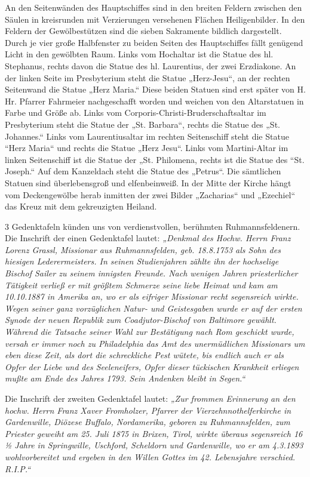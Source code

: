 \documentclass[12pt,a4paper]{book}
\begin{document}
An den Seitenwänden des Hauptschiffes sind in den breiten Feldern zwischen den
Säulen in kreisrunden mit Verzierungen versehenen Flächen Heiligenbilder. In den
Feldern der Gewölbestützen sind die sieben Sakramente bildlich dargestellt.
Durch je vier große Halbfenster zu beiden Seiten des Hauptschiffes fällt
genügend Licht in den gewölbten Raum. Links vom Hochaltar ist die Statue des hl.
Stephanus, rechts davon die Statue des hl. Laurentius, der zwei Erzdiakone. An
der linken Seite im Presbyterium steht die Statue „Herz-Jesu“, an der rechten
Seitenwand die Statue „Herz Maria.“ Diese beiden Statuen sind erst später von H.
Hr. Pfarrer Fahrmeier nachgeschafft worden und weichen von den Altarstatuen in
Farbe und Größe ab. Links vom Corporis-Christi-Bruderschaftsaltar im
Presbyterium steht die Statue der „St. Barbara“, rechts die Statue des „St.
Johannes.“ Links vom Laurentiusaltar im rechten Seitenschiff steht die Statue
“Herz Maria“ und rechts die Statue „Herz Jesu“. Links vom Martini-Altar im
linken Seitenschiff ist die Statue der „St. Philomena, rechts ist die Statue des
“St. Joseph.“ Auf dem Kanzeldach steht die Statue des „Petrus“. Die sämtlichen
Statuen sind überlebensgroß und elfenbeinweiß. In der Mitte der Kirche hängt vom
Deckengewölbe herab inmitten der zwei Bilder „Zacharias“ und „Ezechiel“ das
Kreuz mit dem gekreuzigten Heiland.

3 Gedenktafeln künden uns von verdienstvollen, berühmten Ruhmannsfeldenern. Die
Inschrift der einen Gedenktafel lautet: \emph{„Denkmal des Hochw. Herrn Franz
Lorenz Grassl, Missionar aus Ruhmannsfelden, geb. 18.8.1753 als Sohn des
hiesigen Lederermeisters. In seinen Studienjahren zählte ihn der hochselige
Bischof Sailer zu seinem innigsten Freunde. Nach wenigen Jahren priesterlicher
Tätigkeit verließ er mit größtem Schmerze seine liebe Heimat und kam am
10.10.1887 in Amerika an, wo er als eifriger Missionar recht segensreich wirkte.
Wegen seiner ganz vorzüglichen Natur- und Geistesgaben wurde er auf der ersten
Synode der neuen Republik zum Coadjutor-Bischof von Baltimore gewählt. Während
die Tatsache seiner Wahl zur Bestätigung nach Rom geschickt wurde, versah er
immer noch zu Philadelphia das Amt des unermüdlichen Missionars um eben diese
Zeit, als dort die schreckliche Pest wütete, bis endlich auch er als Opfer der
Liebe und des Seeleneifers, Opfer dieser tückischen Krankheit erliegen mußte am
Ende des Jahres 1793. Sein Andenken bleibt in Segen.“}

Die Inschrift der zweiten Gedenktafel lautet: \emph{„Zur frommen Erinnerung an
den hochw. Herrn Franz Xaver Fromholzer, Pfarrer der Vierzehnnothelferkirche in
Gardenwille, Diözese Buffalo, Nordamerika, geboren zu Ruhmannsfelden, zum
Priester geweiht am 25. Juli 1875 in Brixen, Tirol, wirkte überaus segensreich
16 ½ Jahre in Springwille, Uschford, Scheldorn und Gardenwille, wo er am
4.3.1893 wohlvorbereitet und ergeben in den Willen Gottes im 42. Lebensjahre
verschied. R.I.P.“}
\end{document}
